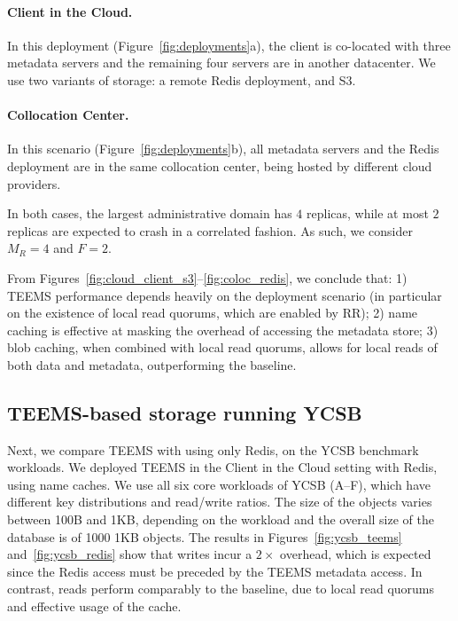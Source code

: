 \paragraph{Client in the Cloud.}
In this deployment (Figure~\ref{fig:deployments}a), the client is
co-located with three metadata servers and the remaining four servers
are in another datacenter.  We use two variants of storage: a
remote Redis deployment, and S3.

\paragraph{Collocation Center.}
In this scenario (Figure~\ref{fig:deployments}b), all metadata
servers and the Redis deployment are in the same collocation center, being hosted by different cloud
providers.

In both cases, the largest administrative domain has $4$
replicas, while at most $2$ replicas are expected to crash
in a correlated fashion. As such, we consider $M_R = 4$ and $F= 2$.

From Figures~\ref{fig:cloud_client_s3}--\ref{fig:coloc_redis}, we
conclude that: 1) \ac{TEEMS} performance depends heavily on the deployment
scenario (in particular on the existence of local read quorums, which
are enabled by \ac{RR}); 2) name caching is effective at masking
the overhead of accessing the metadata store; 3) blob caching, when
combined with local read quorums, allows for local reads of both data
and metadata, outperforming the baseline.


\subsection{\ac{TEEMS}-based storage running \ac{YCSB}}\label{ssec:ycsb}

Next, we compare \ac{TEEMS} with using only
Redis, on the \ac{YCSB} benchmark workloads. We deployed \ac{TEEMS} in the
Client in the Cloud setting with Redis, using name caches. We use all six core workloads
of \ac{YCSB} (A--F), which have different key distributions and read/write
ratios. The size of the objects varies between 100B and 1KB, depending
on the workload and the overall size of the database is of
1000 1KB objects.
%
The results in Figures~\ref{fig:ycsb_teems} and~\ref{fig:ycsb_redis}
show that writes incur a $2\times$ overhead, which is expected since
the Redis access must be preceded by the \ac{TEEMS} metadata access. In
contrast, reads perform comparably to the baseline, due to local
read quorums and effective usage of the cache.


